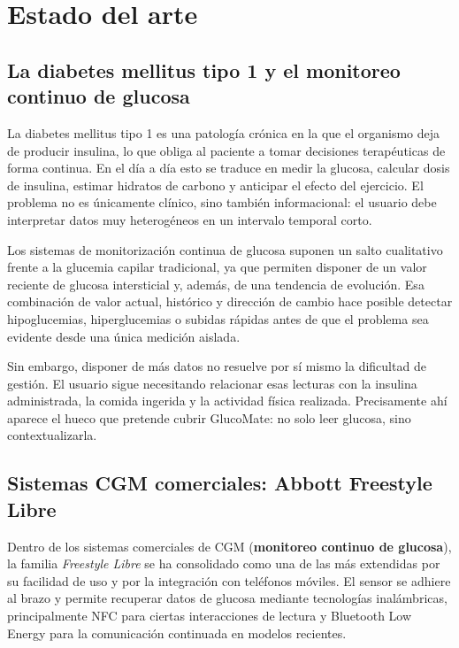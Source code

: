 \chapter{Estado del arte}
\label{cap:estado-arte}

\section{La diabetes mellitus tipo 1 y el monitoreo continuo de glucosa}

La diabetes mellitus tipo 1 es una patología crónica en la que el organismo deja de
producir insulina, lo que obliga al paciente a tomar decisiones terapéuticas de forma
continua. En el día a día esto se traduce en medir la glucosa, calcular dosis de
insulina, estimar hidratos de carbono y anticipar el efecto del ejercicio. El problema no
es únicamente clínico, sino también informacional: el usuario debe interpretar datos muy
heterogéneos en un intervalo temporal corto.

Los sistemas de monitorización continua de glucosa suponen un salto cualitativo frente a
la glucemia capilar tradicional, ya que permiten disponer de un valor reciente de glucosa
intersticial y, además, de una tendencia de evolución. Esa combinación de valor actual,
histórico y dirección de cambio hace posible detectar hipoglucemias, hiperglucemias o
subidas rápidas antes de que el problema sea evidente desde una única medición aislada.

Sin embargo, disponer de más datos no resuelve por sí mismo la dificultad de gestión. El
usuario sigue necesitando relacionar esas lecturas con la insulina administrada, la comida
ingerida y la actividad física realizada. Precisamente ahí aparece el hueco que pretende
cubrir GlucoMate: no solo leer glucosa, sino contextualizarla.

\section{Sistemas CGM comerciales: Abbott Freestyle Libre}

Dentro de los sistemas comerciales de CGM (\textbf{monitoreo continuo de glucosa}), la familia \textit{Freestyle Libre} se ha
consolidado como una de las más extendidas por su facilidad de uso y por la integración
con teléfonos móviles. El sensor se adhiere al brazo y permite recuperar datos de glucosa
mediante tecnologías inalámbricas, principalmente NFC para ciertas interacciones de
lectura y Bluetooth Low Energy para la comunicación continuada en modelos recientes.

